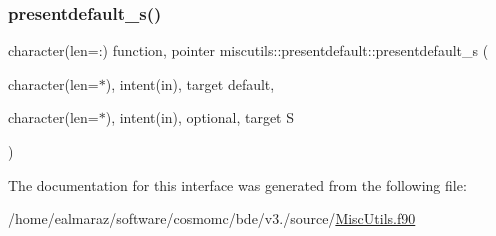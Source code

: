 \mbox{\label{interfacemiscutils_1_1presentdefault_a57292dc30cdf84f88be79d7fcf5f8181}} 
\subsubsection{\texorpdfstring{presentdefault\+\_\+s()}{presentdefault\_s()}}
{\footnotesize\ttfamily character(len=\+:) function, pointer miscutils\+::presentdefault\+::presentdefault\+\_\+s (\begin{DoxyParamCaption}\item[{character(len=$\ast$), intent(in), target}]{default,  }\item[{character(len=$\ast$), intent(in), optional, target}]{S }\end{DoxyParamCaption})}



The documentation for this interface was generated from the following file\+:\begin{DoxyCompactItemize}
\item 
/home/ealmaraz/software/cosmomc/bde/v3./source/\mbox{\hyperlink{MiscUtils_8f90}{Misc\+Utils.\+f90}}\end{DoxyCompactItemize}
